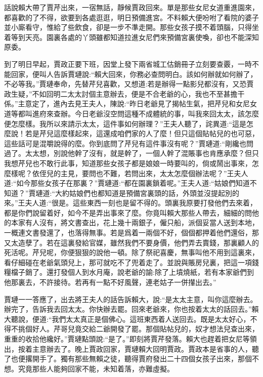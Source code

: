 


\begin{parag}
    話說賴大帶了賈芹出來，一宿無話，靜候賈政回來。單是那些女尼女道重進園來，都喜歡的了不得，欲要到各處逛逛，明日預備進宮。不料賴大便吩咐了看院的婆子並小廝看守，惟給了些飲食，卻是一步不準走開。那些女孩子摸不着頭腦，只得坐着等到天亮。園裏各處的丫頭雖都知道拉進女尼們來預備宮裏使喚，卻也不能深知原委。
\end{parag}


\begin{parag}
    到了明日早起，賈政正要下班，因堂上發下兩省城工估銷冊子立刻要查覈，一時不能回家，便叫人告訴賈璉說:“賴大回來，你務必查問明白。該如何辦就如何辦了，不必等我。”賈璉奉命，先替芹兒喜歡，又想道:若是辦得一點影兒都沒有，又恐賈政生疑，”不如回明二太太討個主意辦去，便是不合老爺的心，我也不至甚擔干係。”主意定了，進內去見王夫人，陳說:“昨日老爺見了揭帖生氣，把芹兒和女尼女道等都叫進府來查辦。今日老爺沒空問這種不成體統的事，叫我來回太太，該怎麼便怎麼樣。我所以來請示太太，這件事如何辦理？”王夫人聽了，詫異道:“這是怎麼說！若是芹兒這麼樣起來，這還成咱們家的人了麼！但只這個貼帖兒的也可惡，這些話可是混嚼說得的麼。你到底問了芹兒有這件事沒有呢？”賈璉道:“剛纔也問過了。太太想，別說他幹了沒有，就是幹了，一個人幹了混賬事也肯應承麼？但只我想芹兒也不敢行此事，知道那些女孩子都是娘娘一時要叫的，倘或鬧出事來，怎麼樣呢？依侄兒的主見，要問也不難，若問出來，太太怎麼個辦法呢？”王夫人道:“如今那些女孩子在那裏？”賈璉道:“都在園裏鎖着呢。”王夫人道:“姑娘們知道不知道？”賈璉道:“大約姑娘們也都知道是預備宮裏頭的話，外頭並沒提起別的來。”王夫人道:“很是。這些東西一刻也是留不得的。頭裏我原要打發他們去來着，都是你們說留着好，如今不是弄出事來了麼。你竟叫賴大那些人帶去，細細的問他的本家有人沒有，將文書查出，花上幾十兩銀子，僱只船，派個妥當人送到本地，一概連文書發還了，也落得無事。若是爲着一兩個不好，個個都押着他們還俗，那又太造孽了。若在這裏發給官媒，雖然我們不要身價，他們弄去賣錢，那裏顧人的死活呢。芹兒呢，你便狠狠的說他一頓。除了祭祀喜慶，無事叫他不用到這裏來，看仔細碰在老爺氣頭兒上，那可就吃不了兜着走了。並說與賬房兒裏，把這一項錢糧檔子銷了。還打發個人到水月庵，說老爺的諭:除了上墳燒紙，若有本家爺們到他那裏去，不許接待。若再有一點不好風聲，連老姑子一併攆出去。”
\end{parag}


\begin{parag}
    賈璉一一答應了，出去將王夫人的話告訴賴大，說:“是太太主意，叫你這麼辦去。辦完了，告訴我去回太太。你快辦去罷。回來老爺來，你也按着太太的話回去。”賴大聽說，便道:“我們太太真正是個佛心。這班東西着人送回去。既是太太好心，不得不挑個好人。芹哥兒竟交給二爺開發了罷。那個貼帖兒的，奴才想法兒查出來，重重的收拾他纔好。”賈璉點頭說:“是了。”即刻將賈芹發落。賴大也趕着把女尼等領出，按着主意辦去了。晚上賈政回家，賈璉賴大回明賈政。賈政本是省事的人，聽了也便撂開手了。獨有那些無賴之徒，聽得賈府發出二十四個女孩子出來，那個不想。究竟那些人能夠回家不能，未知着落，亦難虛擬。
\end{parag}


